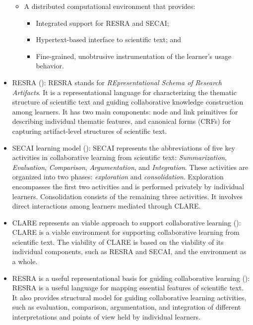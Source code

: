 \begin{itemize}
\begin{itemize}
  \item A distributed computational environment that provides:
    \begin{itemize}
    \item Integrated support for RESRA and SECAI;
      
    \item Hypertext-based interface to scientific text; and
      
    \item Fine-grained, unobtrusive instrumentation of the learner's
      usage behavior.
    \end{itemize}
  \end{itemize}
  
\item {\sf RESRA ()\/}: RESRA stands for {\it
  REpresentational Schema of Research Artifacts\/}. It is a
  representational language for characterizing the thematic structure of
  scientific text and guiding collaborative knowledge construction among
  learners. It has two main components: node and link primitives for
  describing individual thematic features, and canonical forms (CRFs) for
  capturing artifact-level structures of scientific text.

  
\item {\sf SECAI learning model ()\/}: SECAI
  represents the abbreviations of five key activities in collaborative
  learning from scientific text: {\it Summarization\/}, {\it
  Evaluation\/}, {\it Comparison\/}, {\it Argumentation\/}, and {\it
  Integration\/}. These activities are organized into two phases: {\it
  exploration\/} and {\it consolidation\/}.  Exploration encompasses the
  first two activities and is performed privately by individual
  learners. Consolidation consists of the remaining three activities. It
  involves direct interactions among learners mediated through CLARE.
  
\item {\sf CLARE represents an viable approach to support collaborative
  learning ()\/}: CLARE is a viable environment for
  supporting collaborative learning from scientific text. The viability
  of CLARE is based on the viability of its individual components, such
  as RESRA and SECAI, and the environment as a whole.
  
\item {\sf RESRA is a useful representational basis for guiding
  collaborative learning ()\/}: RESRA is a useful
  language for mapping essential features of scientific text. It also
  provides structural model for guiding collaborative learning
  activities, such as evaluation, comparison, argumentation, and
  integration of different interpretations and points of view held by
  individual learners.
  

\end{itemize}
